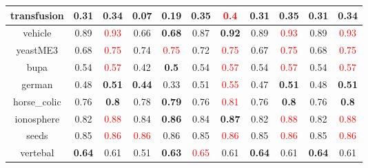 \documentclass{article}%
\begin{document}
\begin{tabular}{c|cccccccccc}
\hline%
transfusion&0.31&\textbf{0.34}&0.07&\textbf{0.19}&0.35&\textcolor{red}{ 
0.4
}&0.31&\textbf{0.35}&0.31&\textbf{0.34}\\%
\hline%
vehicle&0.89&\textcolor{red}{ 
0.93
}&0.66&\textbf{0.68}&0.87&\textbf{0.92}&0.89&\textcolor{red}{ 
0.93
}&0.89&\textcolor{red}{ 
0.93
}\\%
\hline%
yeastME3&0.68&\textcolor{red}{ 
0.75
}&0.74&\textcolor{red}{ 
0.75
}&0.72&\textcolor{red}{ 
0.75
}&0.67&\textcolor{red}{ 
0.75
}&0.68&\textcolor{red}{ 
0.75
}\\%
\hline%
bupa&0.54&\textcolor{red}{ 
0.57
}&0.42&\textbf{0.5}&0.54&\textcolor{red}{ 
0.57
}&0.54&\textcolor{red}{ 
0.57
}&0.54&\textcolor{red}{ 
0.57
}\\%
\hline%
german&0.48&\textbf{0.51}&\textbf{0.44}&0.33&0.51&\textcolor{red}{ 
0.55
}&0.47&\textbf{0.51}&0.48&\textbf{0.51}\\%
\hline%
horse\_colic&0.76&\textbf{0.8}&0.78&\textbf{0.79}&0.76&\textcolor{red}{ 
0.81
}&0.76&\textbf{0.8}&0.76&\textbf{0.8}\\%
\hline%
ionosphere&0.82&\textcolor{red}{ 
0.88
}&0.84&\textbf{0.86}&0.84&\textbf{0.87}&0.82&\textcolor{red}{ 
0.88
}&0.82&\textcolor{red}{ 
0.88
}\\%
\hline%
seeds&0.85&\textcolor{red}{ 
0.86
}&\textcolor{red}{ 
0.86
}&0.86&0.85&\textcolor{red}{ 
0.86
}&0.85&\textcolor{red}{ 
0.86
}&0.85&\textcolor{red}{ 
0.86
}\\%
\hline%
vertebal&\textbf{0.64}&0.61&0.51&\textbf{0.63}&\textcolor{red}{ 
0.65
}&0.61&\textbf{0.64}&0.61&\textbf{0.64}&0.61\\%
\hline%
\end{tabular}

%
\end{document}
